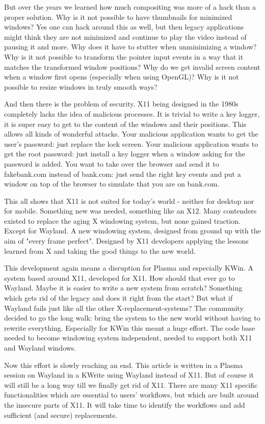 But over the years we learned how much compositing was more of a hack than a proper solution. Why is it not possible to have thumbnails for minimized windows? Yes one can hack around this as well, but then legacy applications might think they are not minimized and continue to play the video instead of pausing it and more. Why does it have to stutter when unminimizing a window? Why is it not possible to transform the pointer input events in a way that it matches the transformed window positions? Why do we get invalid screen content when a window first opens (especially when using OpenGL)? Why is it not possible to resize windows in truly smooth ways?

And then there is the problem of security. X11 being designed in the 1980s completely lacks the idea of malicious processes. It is trivial to write a key logger, it is super easy to get to the content of the windows and their positions. This allows all kinds of wonderful attacks. Your malicious application wants to get  the user's password: just replace the lock screen. Your malicious application wants to get the root password: just install a key logger when a window asking for the password is added. You want to take over the browser and send it to fakebank.com instead of bank.com: just send the right key events and put a window on top of the browser to simulate that you are on bank.com.

This all shows that X11 is not suited for today's world - neither for desktop nor for mobile. Something new was needed, something like an X12. Many contenders existed to replace the aging X windowing system, but none gained traction. Except for Wayland. A new windowing system, designed from ground up with the aim of "every frame perfect". Designed by X11 developers applying the lessons learned from X and taking the good things to the new world.

This development again means a disruption for Plasma and especially KWin. A system based around X11, developed for X11. How should that ever go to Wayland. Maybe it is easier to write a new system from scratch? Something which gets rid of the legacy and does it right from the start? But what if Wayland fails just like all the other X-replacement-systems? The community decided to go the long walk: bring the system to the new world without having to rewrite everything. Especially for KWin this meant a huge effort. The code base needed to become windowing system independent, needed to support both X11 and Wayland windows.

Now this effort is slowly reaching an end. This article is written in a Plasma session on Wayland in a KWrite using Wayland instead of X11. But of course it will still be a long way till we finally get rid of X11. There are many X11 specific functionalities which are essential to users' workflows, but which are built around the insecure parts of X11. It will take time to identify the workflows and add sufficient (and secure) replacements.
